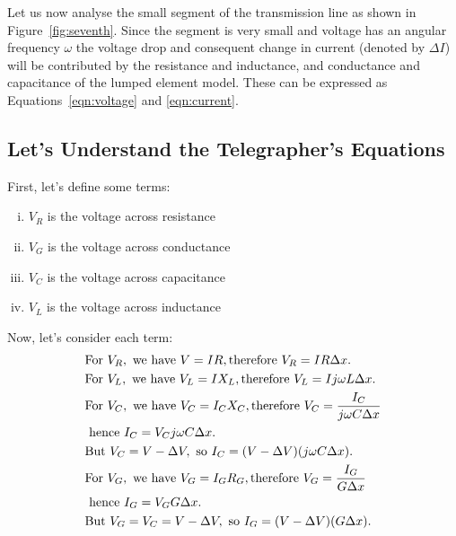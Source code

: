 Let us now analyse the small segment of the transmission line as shown in Figure~\ref{fig:seventh}. Since the segment is very small and voltage has an angular frequency $ \omega $ the voltage drop and consequent change in current (denoted by $\Delta I$) will be contributed by the resistance and inductance, and conductance and capacitance of the lumped element model. These can be expressed as Equations~\eqref{eqn:voltage} and \eqref{eqn:current}.


\subsection{Let's Understand the Telegrapher's Equations}
First, let's define some terms:
\begin{enumerate}[(i)]
\item \(V_{R}\) is the voltage across resistance
\item \(V_{G}\) is the voltage across conductance
\item \(V_{C}\) is the voltage across capacitance
\item \(V_{L}\) is the voltage across inductance
\end{enumerate}

Now, let's consider each term:
\begin{align*}
&\text{For } V_{R}, \text{ we have } V = IR, \text{ 
\newline
therefore } V_{R} = IR \Delta x.\\
&\text{For } V_{L}, \text{ we have } V_{L} = IX_{L}, \text{ 
\newline therefore } V_{L} = Ij\omega L \Delta x.\\
&\text{For } V_{C}, \text{ we have } V_{C} = I_{C}X_{C}, \text{ 
\newline therefore } V_{C} = \frac{I_{C}}{j\omega C \Delta x}\\
\newline &\text{ hence } I_{C} = V_{C}j\omega C \Delta x.\\
&\text{But } V_{C} = V - \Delta V, \text{ so } I_{C} = (V - \Delta V)(j\omega C \Delta x).\\
&\text{For } V_{G}, \text{ we have } V_{G} = I_{G}R_{G}, \text{ 
\newline therefore } V_{G} = \frac{I_{G}}{G \Delta x}\\
\newline &\text{ hence } I_{G} = V_{G}G \Delta x.\\
&\text{But } V_{G} = V_{C} = V - \Delta V, \text{ so } I_{G} = (V - \Delta V)(G \Delta x).
\end{align*}


